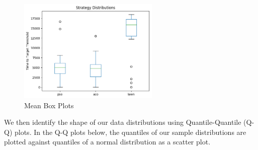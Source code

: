 \documentclass{report}
\begin{document}
\begin{figure}[H]
	\centering
	\includegraphics[width=0.6\textwidth]{images/mean_box_plots}
	\caption{Mean Box Plots}
	\label{fig:meanboxplots}
\end{figure}

We then identify the shape of our data distributions using Quantile-Quantile (Q-Q) plots. In the Q-Q plots below, the quantiles of our sample distributions are plotted against quantiles of a normal distribution as a scatter plot.
\end{document}
